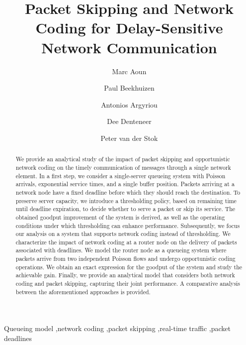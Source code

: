 \documentclass[preprint,12pt]{elsarticle}
\theoremstyle{definition}
\theoremstyle{plain}
\theoremstyle{remark}
\begin{document}
\begin{frontmatter}





\title{Packet Skipping and Network Coding for Delay-Sensitive Network Communication}

\author[label1]{Marc Aoun}
\author[label2]{Paul Beekhuizen}
\author[label3]{Antonios Argyriou}
\author[label1]{Dee Denteneer}
\author[label1]{Peter van der Stok}


 \address[label1]{Philips Research, Eindhoven, 5656AE, The Netherlands}
 \address[label2]{Eurandom, TU/e, Eindhoven, 5656AE, The Netherlands}
 \address[label3]{Department of Computer and Communication Engineering, University of Thessaly, Volos, 38221, Greece}





\begin{abstract}
We provide an analytical study of the impact of packet skipping and opportunistic network coding on the timely communication of messages through a single network element. In a first step, we consider a single-server queueing system with Poisson arrivals, exponential service times, and a single buffer position. Packets arriving at a network node have a fixed deadline before which they should reach the destination. To preserve server capacity, we introduce a thresholding policy, based on remaining time until deadline expiration, to decide whether to serve a packet or skip its service. The obtained goodput improvement of the system is derived, as well as the operating conditions under which thresholding can enhance performance. Subsequently, we focus our analysis on a system that supports network coding instead of thresholding. We characterize the impact of network coding at a router node on the delivery of packets associated with deadlines. We model the router node as a queueing system where packets arrive from two independent Poisson flows and undergo opportunistic coding operations. We obtain an exact expression for the goodput of the system and study the achievable gain. Finally, we provide an analytical model that considers both network coding and packet skipping, capturing their joint performance. A comparative analysis between the aforementioned approaches is provided.

\end{abstract}

\begin{keyword}
Queueing model \sep network coding \sep packet skipping \sep real-time traffic \sep packet deadlines




\end{keyword}

\end{frontmatter}
\end{document}
